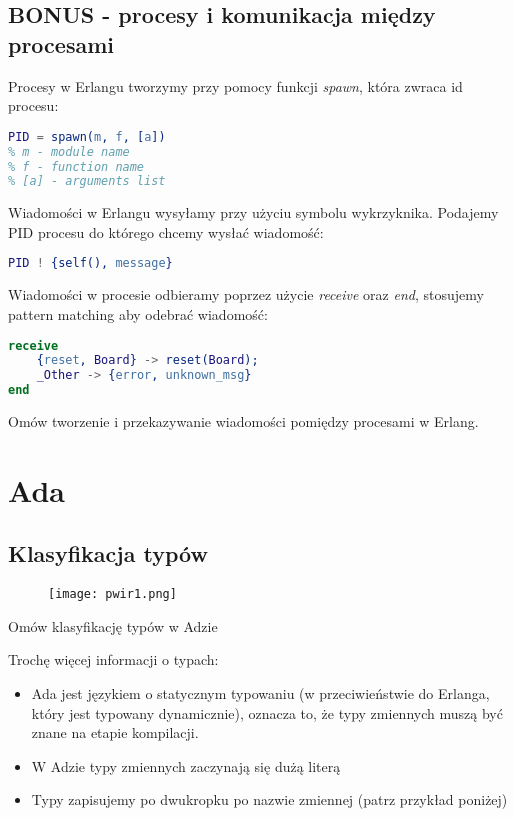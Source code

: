 \documentclass[a4paper,15pt]{article}
\newcommand{\ask}[2]{
    \begin{tcolorbox}[colback=black!5!white,colframe=gray,title={Pytanie #1}]
        #2
    \end{tcolorbox}
}
\begin{document}
\subsection{BONUS - procesy i komunikacja między procesami}
Procesy w Erlangu tworzymy przy pomocy funkcji \textit{spawn}, która zwraca id procesu:
\begin{lstlisting}[language=Erlang]
PID = spawn(m, f, [a]) 
% m - module name
% f - function name
% [a] - arguments list
\end{lstlisting}
Wiadomości w Erlangu wysyłamy przy użyciu symbolu wykrzyknika. Podajemy PID procesu do którego chcemy wysłać wiadomość:
\begin{lstlisting}[language=Erlang]
PID ! {self(), message}
\end{lstlisting}
Wiadomości w procesie odbieramy poprzez użycie \textit{receive} oraz \textit{end}, stosujemy pattern matching aby odebrać wiadomość:
\begin{lstlisting}[language=Erlang]
receive
	{reset, Board} -> reset(Board);
	_Other -> {error, unknown_msg}
end
\end{lstlisting}
\ask{}{
Omów tworzenie i przekazywanie wiadomości pomiędzy procesami w Erlang.
}



\section{Ada}

\subsection{Klasyfikacja typów}

\begin{figure}[H]
\centering
  \texttt{[image: pwir1.png]}
\end{figure}

\ask{}{
Omów klasyfikację typów w Adzie
}

Trochę więcej informacji o typach:
\begin{itemize}
\item Ada jest językiem o statycznym typowaniu (w przeciwieństwie do Erlanga, który jest typowany dynamicznie), oznacza to, że typy zmiennych muszą być znane na etapie kompilacji.
\item W Adzie typy zmiennych zaczynają się dużą literą
\item Typy zapisujemy po dwukropku po nazwie zmiennej (patrz przykład poniżej)
\end{itemize}
\end{document}

